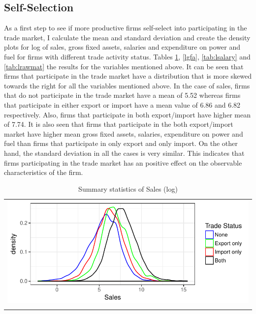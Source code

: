 \documentclass[11pt]{article}
\begin{document}
\subsection{Self-Selection}
As a first step to see if more productive firms self-select into
participating in the trade market, I calculate the mean and standard
deviation and create the density plots for log of  sales, gross fixed assets,
salaries and  expenditure on power and fuel for firms with different
trade activity status. 
Tables \ref{lsales}, \ref{lgfa}, \ref{tab:lsalary} and \ref{tab:lrawmat} the results for the variables mentioned above. 
It can be seen that firms that participate in the trade market have
a distribution that is more skewed towards the right for all the
variables mentioned above. In the case of sales, firms that do not
participate in the trade market have a mean of 5.52 whereas firms that
participate in either export or import have a mean value of 6.86 and
6.82 respectively. Also, firms that participate in both export/import
have higher mean of 7.74.  It is also seen
that firms that participate in the both export/import market have
higher mean gross fixed assets,
salaries, expenditure on power and fuel than firms that participate in
only export and only import. On the other hand, the standard deviation in all
the cases is very similar. This indicates that firms participating
in the trade market has an positive effect on the observable characteristics of the firm.
\begin{center}
\begin{table}[htp]
\caption{Summary statistics of Sales (log)}
\label{lsales}
\begin{tabular}{c}
 \includegraphics{./PICS/denslsales.pdf}   \\ 
   \\  
\end{tabular}
\end{table}
\end{center}
\end{document}
